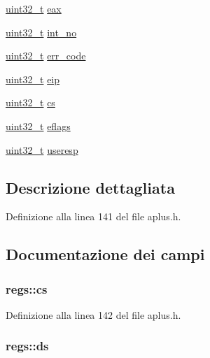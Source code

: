 \begin{DoxyCompactItemize}
\hyperlink{aplus_8h_a53a0df51603c77c2aa5b9ea61b606a82}{uint32\+\_\+t} \hyperlink{structregs_a8fa1f22a8e8ac6908cc7710c8396f9dc}{eax}
\item 
\hyperlink{aplus_8h_a53a0df51603c77c2aa5b9ea61b606a82}{uint32\+\_\+t} \hyperlink{structregs_ae15fe95c86d4f1c84d475f3d709286b5}{int\+\_\+no}
\item 
\hyperlink{aplus_8h_a53a0df51603c77c2aa5b9ea61b606a82}{uint32\+\_\+t} \hyperlink{structregs_a938e9e8adf0d430fefc20bea83650718}{err\+\_\+code}
\item 
\hyperlink{aplus_8h_a53a0df51603c77c2aa5b9ea61b606a82}{uint32\+\_\+t} \hyperlink{structregs_a69756a0c0f29041c01160de72c4163b8}{eip}
\item 
\hyperlink{aplus_8h_a53a0df51603c77c2aa5b9ea61b606a82}{uint32\+\_\+t} \hyperlink{structregs_a2d8cf067e67462a631c823b368ce67c4}{cs}
\item 
\hyperlink{aplus_8h_a53a0df51603c77c2aa5b9ea61b606a82}{uint32\+\_\+t} \hyperlink{structregs_a795e8ffcd28d56b617a2d535b2d1394c}{eflags}
\item 
\hyperlink{aplus_8h_a53a0df51603c77c2aa5b9ea61b606a82}{uint32\+\_\+t} \hyperlink{structregs_af7e777e1535d887de07a5bf3d11eb15f}{useresp}
\end{DoxyCompactItemize}


\subsection{Descrizione dettagliata}


Definizione alla linea 141 del file aplus.\+h.



\subsection{Documentazione dei campi}
\hypertarget{structregs_a2d8cf067e67462a631c823b368ce67c4}{
\subsubsection[{cs}]{ regs\+::cs}}\label{structregs_a2d8cf067e67462a631c823b368ce67c4}


Definizione alla linea 142 del file aplus.\+h.

\hypertarget{structregs_aa29daa3553339a188913853a1d91e30a}{
\subsubsection[{ds}]{ regs\+::ds}}\label{structregs_aa29daa3553339a188913853a1d91e30a}



